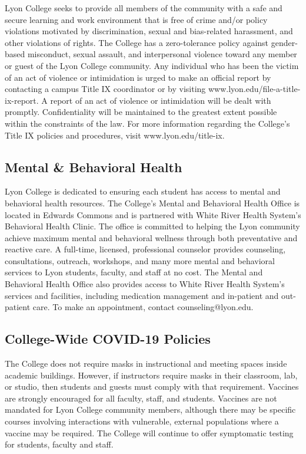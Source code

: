 \documentclass[11pt]{article}
\begin{document}
Lyon College seeks to provide all members of the community with a safe
and secure learning and work environment that is free of crime and/or
policy violations motivated by discrimination, sexual and bias-related
harassment, and other violations of rights. The College has a
zero-tolerance policy against gender-based misconduct, sexual assault,
and interpersonal violence toward any member or guest of the Lyon
College community. Any individual who has been the victim of an act of
violence or intimidation is urged to make an official report by
contacting a campus Title IX coordinator or by visiting
www.lyon.edu/file-a-title-ix-report. A report of an act of violence or
intimidation will be dealt with promptly. Confidentiality will be
maintained to the greatest extent possible within the constraints of
the law. For more information regarding the College’s Title IX
policies and procedures, visit www.lyon.edu/title-ix.

\subsection{Mental \& Behavioral Health}
\label{sec:org8b5b518}

Lyon College is dedicated to ensuring each student has access to
mental and behavioral health resources. The College’s Mental and
Behavioral Health Office is located in Edwards Commons and is
partnered with White River Health System’s Behavioral Health
Clinic. The office is committed to helping the Lyon community achieve
maximum mental and behavioral wellness through both preventative and
reactive care. A full-time, licensed, professional counselor provides
counseling, consultations, outreach, workshops, and many more mental
and behavioral services to Lyon students, faculty, and staff at no
cost. The Mental and Behavioral Health Office also provides access to
White River Health System’s services and facilities, including
medication management and in-patient and out-patient care. To make an
appointment, contact counseling@lyon.edu.

\subsection{College-Wide COVID-19 Policies}
\label{sec:orgd466e8a}

The College does not require masks in instructional and meeting spaces
inside academic buildings. However, if instructors require masks in
their classroom, lab, or studio, then students and guests must comply
with that requirement.  Vaccines are strongly encouraged for all
faculty, staff, and students. Vaccines are not mandated for Lyon
College community members, although there may be specific courses
involving interactions with vulnerable, external populations where a
vaccine may be required.  The College will continue to offer
symptomatic testing for students, faculty and staff.
\end{document}
